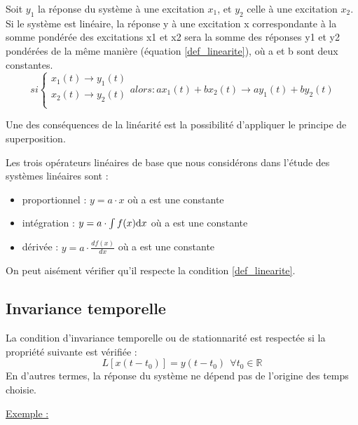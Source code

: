 	Soit $y_{1}$ la réponse du système à une excitation $x_{1}$, et $y_{2}$ celle à une excitation $x_{2}$. Si le système est linéaire, la réponse y à une excitation x correspondante à la somme pondérée des excitations x1 et x2 sera la somme des réponses y1 et y2 pondérées de la même manière (équation \ref{def_linearite}), où a et b sont deux constantes.
	\begin{equation}\label{def_linearite}
	si    \left \{
	\begin{array}{l}
	x_{1}(t)\rightarrow y_{1}(t)  \\
	x_{2}(t)\rightarrow y_{2}(t)   \\
	\end{array}
	\right . alors: ax_{1}(t)+bx_{2}(t)\rightarrow ay_{1}(t)+by_{2}(t)
	\end{equation}
	
	
	Une des conséquences de la linéarité est la possibilité d'appliquer le principe de superposition.
	
	Les trois opérateurs linéaires de base que nous considérons dans l'étude des systèmes linéaires sont :
	\begin{itemize}
		\item proportionnel : $y = a\cdot x$ où a est une constante 
		\item intégration : $y = a\cdot \int f(x) \mathrm{d} x $ où a est une constante
		\item dérivée : $y = a\cdot \frac{df(x)}{dx} $ où a est une constante
	\end{itemize}

	\vspace{0.5\baselineskip}
	
	On peut aisément vérifier qu'il respecte la condition \ref{def_linearite}.
	
	\subsection{Invariance temporelle}
	La condition d'invariance temporelle ou de stationnarité est respectée si la propriété suivante est vérifiée :
	\begin{equation}
	L[x(t-t_{0})] = y(t-t_{0}) ~~\forall t_{0} \in \mathbb{R}
	\end{equation}
	En d'autres termes, la réponse du système ne dépend pas de l'origine des temps choisie.
	
	\vspace{1\baselineskip}
	\underline{Exemple :}
	\vspace{0.5\baselineskip}
	

